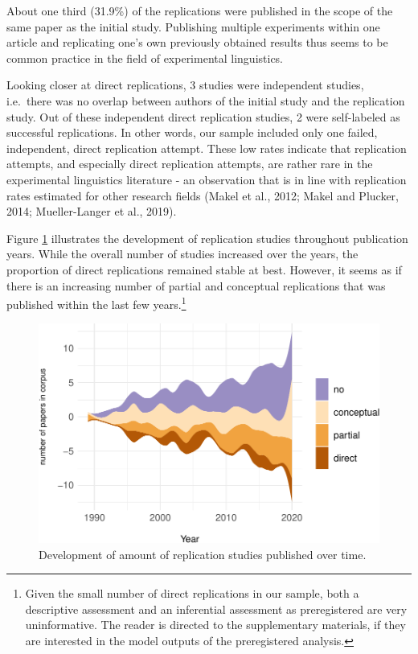 \documentclass[]{elsarticle} %
\begin{document}
About one third (31.9\%) of the replications were published in the scope of the same paper as the initial study. Publishing multiple experiments within one article and replicating one's own previously obtained results thus seems to be common practice in the field of experimental linguistics.

Looking closer at direct replications, 3 studies were independent studies, i.e.~there was no overlap between authors of the initial study and the replication study.
Out of these independent direct replication studies, 2 were self-labeled as successful replications.
In other words, our sample included only one failed, independent, direct replication attempt. These low rates indicate that replication attempts, and especially direct replication attempts, are rather rare in the experimental linguistics literature - an observation that is in line with replication rates estimated for other research fields (Makel et al., 2012; Makel and Plucker, 2014; Mueller-Langer et al., 2019).

Figure \ref{fig:stream-plot} illustrates the development of replication studies throughout publication years.
While the overall number of studies increased over the years, the proportion of direct replications remained stable at best.
However, it seems as if there is an increasing number of partial and conceptual replications that was published within the last few years.\footnote{Given the small number of direct replications in our sample, both a descriptive assessment and an inferential assessment as preregistered are very uninformative. The reader is directed to the supplementary materials, if they are interested in the model outputs of the preregistered analysis.}

\begin{figure}

{\centering \includegraphics[width=1\linewidth]{ReplicationLing_files/figure-latex/stream-plot-1} 

}

\caption{Development of amount of replication studies published over time.}\label{fig:stream-plot}
\end{figure}
\end{document}
